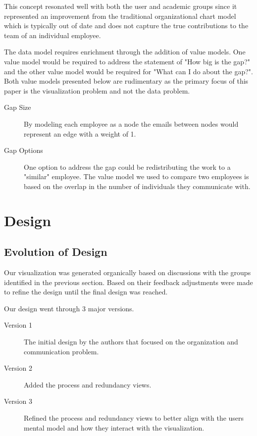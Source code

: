 \documentclass[journal]{vgtc}                %
\begin{document}
This concept resonated well with both the user and academic groups since it represented an improvement from the traditional organizational chart model which is typically out of date and does not capture the true contributions to the team of an individual employee.

The data model requires enrichment through the addition of value models.  One value model would be required to address the statement of "How big is the gap?" and the other value model would be required for "What can I do about the gap?".  Both value models presented below are rudimentary as the primary focus of this paper is the visualization problem and not the data problem.

\begin{description}
\item [Gap Size] By modeling each employee as a node the emails between nodes would represent an edge with a weight of 1.
\item [Gap Options] One option to address the gap could be redistributing the work to a "similar" employee. The value model we used to compare two employees is based on the overlap in the number of individuals they communicate with. 
\end{description}

\section{Design}
\label{sec:design}

\subsection{Evolution of Design}
Our visualization was generated organically based on discussions with the groups identified in the previous section.  Based on their feedback adjustments were made to refine the design until the final design was reached.

Our design went through 3 major versions.
\begin{description}
	\item [Version 1] The initial design by the authors that focused on the organization and communication problem.
	\item [Version 2] Added the process and redundancy views.
	\item [Version 3] Refined the process and redundancy views to better align with the users mental model and how they interact with the visualization.
\end{description}
\end{document}
